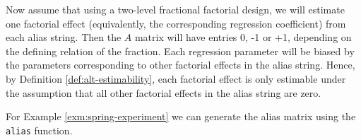 \documentclass[
]{book}
\newenvironment{Shaded}{\begin{snugshade}}{\end{snugshade}}
\newcommand{\FunctionTok}[1]{\textcolor[rgb]{0.00,0.00,0.00}{#1}}
\newcommand{\NormalTok}[1]{#1}
\newcommand{\SpecialCharTok}[1]{\textcolor[rgb]{0.00,0.00,0.00}{#1}}
\theoremstyle{definition}
\theoremstyle{definition}
\theoremstyle{definition}
\theoremstyle{definition}
\theoremstyle{remark}
\begin{document}
Now assume that using a two-level fractional factorial design, we will estimate one factorial effect (equivalently, the corresponding regression coefficient) from each alias string. Then the \(A\) matrix will have entries 0, -1 or +1, depending on the defining relation of the fraction. Each regression parameter will be biased by the parameters corresponding to other factorial effects in the alias string. Hence, by Definition \ref{def:alt-estimability}, each factorial effect is only estimable under the assumption that all other factorial effects in the alias string are zero.

For Example \ref{exm:spring-experiment} we can generate the alias matrix using the \texttt{alias} function.

\begin{Shaded}
\end{Shaded}
\end{document}
